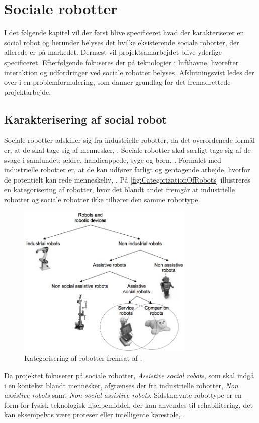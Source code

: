 \chapter{Sociale robotter}
\label{SocialRobot}
%
I det følgende kapitel vil der først blive specificeret hvad der karakteriserer en social robot og herunder belyses det hvilke eksisterende sociale robotter, der allerede er på markedet. Dernæst vil projektsamarbejdet blive yderlige specificeret. Efterfølgende fokuseres der på teknologier i lufthavne, hvorefter interaktion og udfordringer ved sociale robotter belyses. Afslutningsvist ledes der over i en problemformulering, som danner grundlag for det fremadrettede projektarbejde.
%
\section{Karakterisering af social robot}
\label{KarakteriseringAfSocialRobot}
%
Sociale robotter adskiller sig fra industrielle robotter, da det overordenede formål er, at de skal tage sig af mennesker, \parencite[s. 13]{PDF:RobotShiftFromIPtoSR}. Sociale robotter skal særligt tage sig af de svage i samfundet; ældre, handicappede, syge og børn, \parencite[s. 14]{PDF:RobotShiftFromIPtoSR}. Formålet med industrielle robotter er, at de kan udfører farligt og gentagende arbejde, hvorfor de potentielt kan rede menneskeliv, \parencite[ss. 12-13]{PDF:RobotShiftFromIPtoSR}. På \autoref{fig:CategorizationOfRobots} illustreres en kategorisering af robotter, hvor det blandt andet fremgår at industrielle robotter og sociale robotter ikke tilhører den samme robottype.    
%
\begin{figure}[H]
\centering
\includegraphics[width = 0.75\textwidth]{Figure/CategorizationOfRobots} 
\caption{Kategorisering af robotter fremsat af \textcite[s. 13]{PDF:AssesingAcceptance}.}
\label{fig:CategorizationOfRobots}
\end{figure}
\noindent 
%
Da projektet fokuserer på sociale robotter, \textit{Assistive social robots}, som skal indgå i en kontekst blandt mennesker, afgrænses der fra industrielle robotter, \textit{Non assistive robots} samt \textit{Non social assistive robots}. Sidstnævnte robottype er en form for fysisk teknologisk hjælpemiddel, der kan anvendes til rehabilitering, det kan eksempelvis være proteser eller intelligente kørestole, \parencite[s. 12]{PDF:AssesingAcceptance}.    

